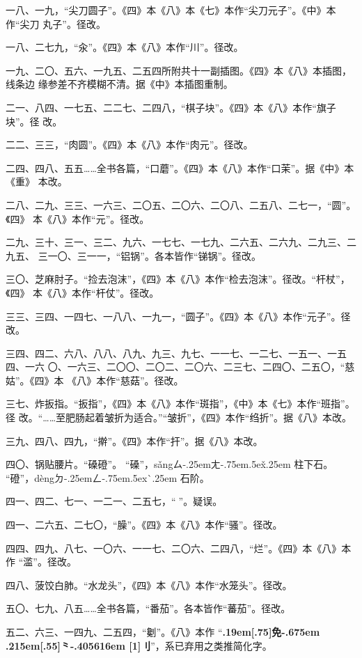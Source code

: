 \begin{list}{}
一八、一九，“尖刀圆子”。《四》本《八》本《七》本作“尖刀元子”。《中》本作“尖刀
丸子”。径改。

一八、二七九，“汆”。《四》本《八》本作“川”。径改。

一九、二〇、五六、一九五、二五四所附共十一副插图。《四》本《八》本插图，线条边
缘参差不齐模糊不清。据《中》本插图重制。

二一、八四、一七五、二二七、二四八，“棋子块”。《四》本《八》本作“旗子块”。径
改。

二二、三三，“肉圆”。《四》本《八》本作“肉元”。径改。

二四、四八、五五……全书各篇，“口蘑”。《四》本《八》本作“口茉”。据《中》本《重》
本改。

二八、二九、三三、一六三、二〇五、二〇六、二〇八、二五八、二七一，“圆”。《四》
本《八》本作“元”。径改。

二九、三十、三一、三二、九六、一七七、一七九、二六五、二六九、二九三、二九五、
三一〇、三一一，“铝锅”。各本皆作“锑锅”。径改。

三〇、芝麻肘子。“捡去泡沫”，《四》本《八》本作“检去泡沫”。径改。“杆杖”，《四》
本《八》本作“杆仗”。径改。

三三、三四、一四七、一八八、一九一，“圆子”。《四》本《八》本作“元子”。径改。

三四、四二、六八、八八、八九、九三、九七、一一七、一二七、一五一、一五四、一六
〇、一六三、二〇〇、二〇二、二〇六、二三七、二四〇、二五〇，“慈姑”。《四》本
《八》本作“慈菇”。径改。

三七、炸扳指。“扳指”，《四》本《八》本作“斑指”，《中》本《七》本作“班指”。径
改。“……至肥肠起着皱折为适合。”“皱折”，《四》本作“绉折”。据《八》本改。

三九、四八、四九，“擀”。《四》本作“扞”。据《八》本改。

四〇、锅贴腰片。“磉磴”。
“磉”，{s\v{a}ng}{ㄙ\kern-.25emㄤ\kern-.75em\raise.5ex\hbox{\v{}}\kern.25em}
柱下石。
“磴”，{d\`{e}ng}{ㄉ\kern-.25emㄥ\kern-.75em\raise.5ex\hbox{\`{}}\kern.25em}
石阶。

四一、四二、七一、一二一、二五七，“𠟤”。疑误。

四一、二六五、二七〇，“臊”。《四》本《八》本作“骚”。径改。

四四、四九、八七、一〇六、一一七、二〇六、二四八，“烂”。《四》本《八》本作
“滥”。径改。

四八、菠饺白肺。“水龙头”，《四》本《八》本作“水笼头”。径改。

五〇、七九、八五……全书各篇，“番茄”。各本皆作“蕃茄”。径改。

五二、六三、一四九、二五四，“劖”。《八》本作
“{\bfseries\raise.19em\hbox{\scalebox{.675}[.75]{免}}\kern-.675em%
\lower.215em\hbox{\scalebox{.95}[.55]{⺀}}\kern-.405616em%
\scalebox{.65}[1]{刂}}”，系已弃用之类推简化字。


\end{list}
